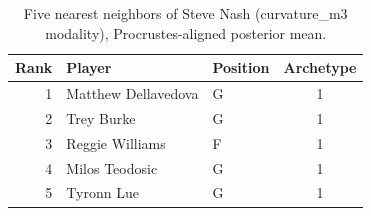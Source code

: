 \begin{table}[htbp]
  \centering\small
  \begin{tabular}{rllc}
    \toprule
    Rank & Player & Position & Archetype \\
    \midrule
    1 & Matthew Dellavedova & G & 1 \\
    2 & Trey Burke & G & 1 \\
    3 & Reggie Williams & F & 1 \\
    4 & Milos Teodosic & G & 1 \\
    5 & Tyronn Lue & G & 1 \\
    \bottomrule
  \end{tabular}
  \caption{Five nearest neighbors of Steve Nash (curvature_m3 modality), Procrustes-aligned posterior mean.}
  \label{tab:Steve_Nash_neighbors_curvature_m3}
\end{table}

